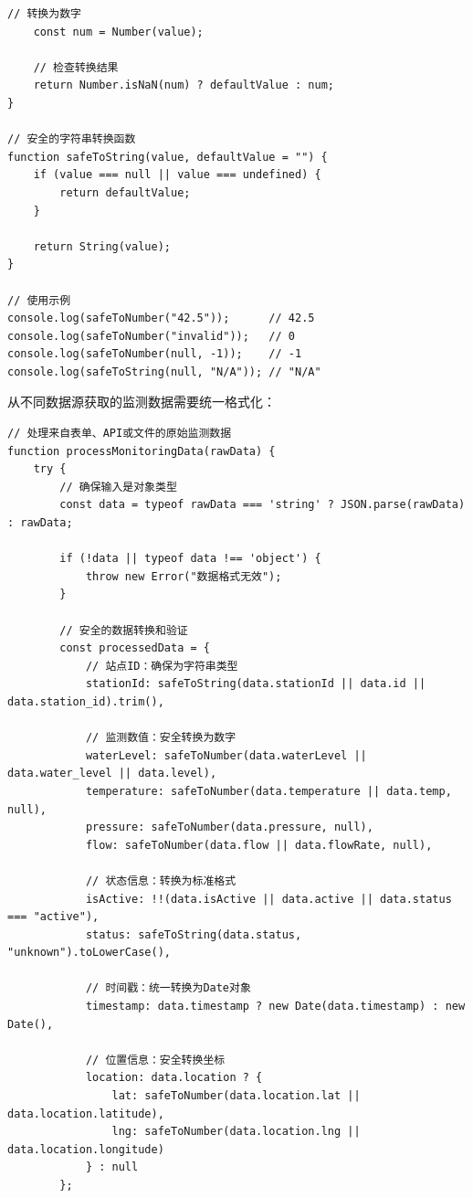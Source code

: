 {\begin{lstlisting}[style=javascript]
    // 转换为数字
    const num = Number(value);
    
    // 检查转换结果
    return Number.isNaN(num) ? defaultValue : num;
}

// 安全的字符串转换函数
function safeToString(value, defaultValue = "") {
    if (value === null || value === undefined) {
        return defaultValue;
    }
    
    return String(value);
}

// 使用示例
console.log(safeToNumber("42.5"));      // 42.5
console.log(safeToNumber("invalid"));   // 0
console.log(safeToNumber(null, -1));    // -1
console.log(safeToString(null, "N/A")); // "N/A"
\end{lstlisting}


从不同数据源获取的监测数据需要统一格式化：

\begin{lstlisting}[style=javascript]
// 处理来自表单、API或文件的原始监测数据
function processMonitoringData(rawData) {
    try {
        // 确保输入是对象类型
        const data = typeof rawData === 'string' ? JSON.parse(rawData) : rawData;
        
        if (!data || typeof data !== 'object') {
            throw new Error("数据格式无效");
        }
        
        // 安全的数据转换和验证
        const processedData = {
            // 站点ID：确保为字符串类型
            stationId: safeToString(data.stationId || data.id || data.station_id).trim(),
            
            // 监测数值：安全转换为数字
            waterLevel: safeToNumber(data.waterLevel || data.water_level || data.level),
            temperature: safeToNumber(data.temperature || data.temp, null),
            pressure: safeToNumber(data.pressure, null),
            flow: safeToNumber(data.flow || data.flowRate, null),
            
            // 状态信息：转换为标准格式
            isActive: !!(data.isActive || data.active || data.status === "active"),
            status: safeToString(data.status, "unknown").toLowerCase(),
            
            // 时间戳：统一转换为Date对象
            timestamp: data.timestamp ? new Date(data.timestamp) : new Date(),
            
            // 位置信息：安全转换坐标
            location: data.location ? {
                lat: safeToNumber(data.location.lat || data.location.latitude),
                lng: safeToNumber(data.location.lng || data.location.longitude)
            } : null
        };
        

\end{lstlisting}}
